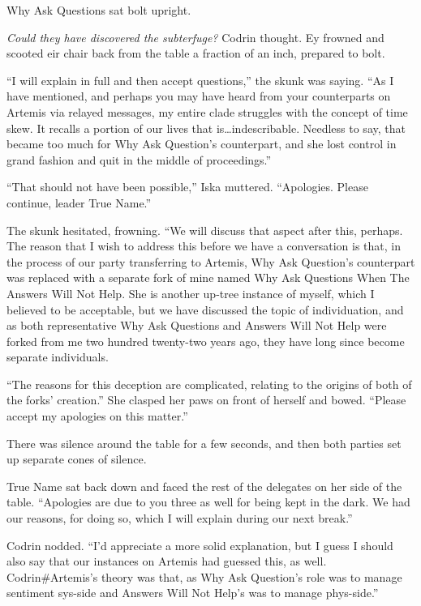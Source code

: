 Why Ask Questions sat bolt upright.

\emph{Could they have discovered the subterfuge?} Codrin thought. Ey frowned and scooted eir chair back from the table a fraction of an inch, prepared to bolt.

``I will explain in full and then accept questions,'' the skunk was saying. ``As I have mentioned, and perhaps you may have heard from your counterparts on Artemis via relayed messages, my entire clade struggles with the concept of time skew. It recalls a portion of our lives that is\ldots indescribable. Needless to say, that became too much for Why Ask Question's counterpart, and she lost control in grand fashion and quit in the middle of proceedings.''

``That should not have been possible,'' Iska muttered. ``Apologies. Please continue, leader True Name.''

The skunk hesitated, frowning. ``We will discuss that aspect after this, perhaps. The reason that I wish to address this before we have a conversation is that, in the process of our party transferring to Artemis, Why Ask Question's counterpart was replaced with a separate fork of mine named Why Ask Questions When The Answers Will Not Help. She is another up-tree instance of myself, which I believed to be acceptable, but we have discussed the topic of individuation, and as both representative Why Ask Questions and Answers Will Not Help were forked from me two hundred twenty-two years ago, they have long since become separate individuals.

``The reasons for this deception are complicated, relating to the origins of both of the forks' creation.'' She clasped her paws on front of herself and bowed. ``Please accept my apologies on this matter.''

There was silence around the table for a few seconds, and then both parties set up separate cones of silence.

True Name sat back down and faced the rest of the delegates on her side of the table. ``Apologies are due to you three as well for being kept in the dark. We had our reasons, for doing so, which I will explain during our next break.''

Codrin nodded. ``I'd appreciate a more solid explanation, but I guess I should also say that our instances on Artemis had guessed this, as well. Codrin\#Artemis's theory was that, as Why Ask Question's role was to manage sentiment sys-side and Answers Will Not Help's was to manage phys-side.''

